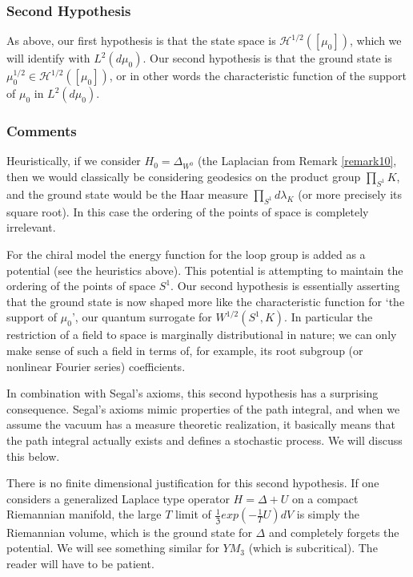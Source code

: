\documentclass{amsart}
\theoremstyle{conjecture}
\theoremstyle{definition}
\theoremstyle{question}
\theoremstyle{questions}
\theoremstyle{remark}
\theoremstyle{remarks}
\theoremstyle{example}
\numberwithin{equation}{section}
\begin{document}
\subsubsection{Second Hypothesis}

As above, our first hypothesis is that the state space is $\mathcal H^{1/2}([\mu_0])$, which we will identify with $L^2(d\mu_0)$. Our second hypothesis is that the ground state is $\mu_0^{1/2}\in \mathcal H^{1/2}([\mu_0])$, or in other words the characteristic function of the support of $\mu_0$ in $L^2(d\mu_0)$.  \\

\subsubsection{Comments} Heuristically, if we consider $H_0=\Delta_{W^0} $ (the Laplacian from Remark \ref{remark10},
then we would classically be considering geodesics on the product group  $\prod_{S^1}K$, and the ground state would be the Haar measure $\prod_{S^1}d\lambda_K$ (or more precisely its square root). In this case the ordering of the points of space is completely irrelevant.

For the chiral model the energy function for the loop group is added as a potential (see the heuristics above). This potential is attempting to maintain the ordering
of the points of space $S^1$. Our second hypothesis is essentially asserting that the ground state is now shaped more like the characteristic function for `the support of $\mu_0$', our quantum surrogate for $W^{1/2}(S^1,K)$. In particular the restriction of a field to
space is marginally distributional in nature; we can only make sense of such a field in terms of, for example, its root subgroup (or nonlinear Fourier series) coefficients.

In combination with Segal's axioms, this second hypothesis has a surprising consequence. Segal's axioms mimic properties of the path integral, and when we assume the vacuum has a measure theoretic realization, it basically means that the path integral actually exists and defines a stochastic process. We will discuss this below.

There is no finite dimensional justification for this second hypothesis. If one considers a generalized Laplace type operator $H=\Delta+U$ on a compact Riemannian manifold, the large $T$ limit of $\frac{1}{\mathfrak Z}exp(-\frac 1T U)dV$ is simply the Riemannian volume, which is the ground state for $\Delta$ and completely forgets the potential. We will see something similar for $YM_3$ (which is subcritical). The reader will have to be patient.    
\end{document}

